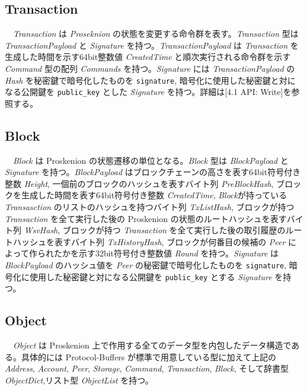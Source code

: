 \hypertarget{transaction}{%
\subsection{Transaction}\label{transaction}}

　\emph{Transaction} は \emph{Proseknion}
の状態を変更する命令群を表す。\emph{Transaction} 型は
\emph{TransactionPayload} と \emph{Signature}
を持つ。\emph{TransactionPayload} は \emph{Transaction}
を生成した時間を示す64bit整数値 \emph{CreatedTime}
と順次実行される命令群を示す \emph{Command} 型の配列 \emph{Commands}
を持つ。\emph{Signature} には \emph{TransactionPayload} の \emph{Hash}
を秘密鍵で暗号化したものを \texttt{signature},
暗号化に使用した秘密鍵と対になる公開鍵を \texttt{public\_key} とした
\emph{Signature} を持つ。詳細は{[}4.1 API: Write{]}を参照する。

\hypertarget{block}{%
\subsection{Block}\label{block}}

　\emph{Block} は Proskenion の状態遷移の単位となる。\emph{Block} 型は
\emph{BlockPayload} と \emph{Signature} を持つ。\emph{BlockPayload}
はブロックチェーンの高さを表す64bit符号付き整数 \emph{Height},
一個前のブロックのハッシュを表すバイト列 \emph{PreBlockHash},
ブロックを生成した時間を表す64bit符号付き整数 \emph{CreatedTime},
\emph{Block}が持っている \emph{Transasction}
のリストのハッシュを持つバイト列 \emph{TxListHash}, ブロックが持つ
\emph{Transaction} を全て実行した後の Proskenion
の状態のルートハッシュを表すバイト列 \emph{WsvHash}, ブロックが持つ
\emph{Transaction}
を全て実行した後の取引履歴のルートハッシュを表すバイト列
\emph{TxHistoryHash}, ブロックが何番目の候補の \emph{Peer}
によって作られたかを示す32bit符号付き整数値 \emph{Round}
を持つ。\emph{Signature} は \emph{BlockPayload} のハッシュ値を
\emph{Peer} の秘密鍵で暗号化したものを \texttt{signature},
暗号化に使用した秘密鍵と対になる公開鍵を \texttt{public\_key} とする
\emph{Signature} を持つ。

\hypertarget{object}{%
\subsection{Object}\label{object}}

　\emph{Object} は Proskenion
上で作用する全てのデータ型を内包したデータ構造である。具体的には
Protocol-Buffers が標準で用意している型に加えて上記の\emph{Address},
\emph{Account}, \emph{Peer}, \emph{Storage}, \emph{Command},
\emph{Transaction}, \emph{Block}, そして辞書型
\emph{ObjectDict},リスト型 \emph{ObjectList} を持つ。


